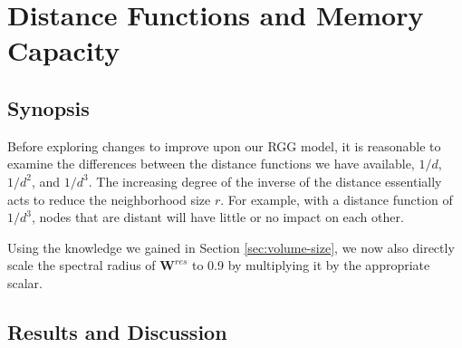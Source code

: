 \section{Distance Functions and Memory Capacity}
\label{sec:dist-func}

\subsection{Synopsis}

Before exploring changes to improve upon our RGG model, it is reasonable to
examine the differences between the distance functions we have available, $1/d$,
$1/d^2$, and $1/d^3$. The increasing degree of the inverse of the distance
essentially acts to reduce the neighborhood size $r$. For example, with a
distance function of $1/d^3$, nodes that are distant will have little or no
impact on each other.

Using the knowledge we gained in Section \ref{sec:volume-size}, we now also
directly scale the spectral radius of $\mathbf{W}^{res}$ to 0.9 by multiplying
it by the appropriate scalar.

\subsection{Results and Discussion}

